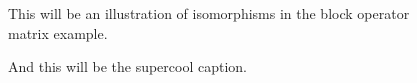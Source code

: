 \begin{figure}
	This will be an illustration of isomorphisms in the block operator matrix example.
	\caption{And this will be the supercool caption.}
	\label{fig:block-operator-example}
\end{figure}
